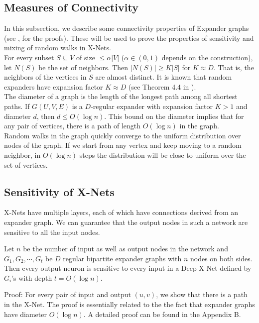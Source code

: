 \subsection{Measures of Connectivity}

\noindent In this subsection, we describe some connectivity properties of Expander graphs (see \cite{salil2012pseudo}, for the proofs). These will be used to prove the properties of sensitivity and mixing of random walks in X-Nets.\\

 For every subset $S \subseteq V$ of size $\leq \alpha |V|$ ($\alpha \in (0,1)$ depends on the construction), let $N(S)$ be the set of neighbors. Then $|N(S)| \geq K |S|$ for $K\approx D$. That is, the neighbors of the vertices in $S$ are almost distinct. It is known that random expanders have expansion factor $K \approx D$ (see Theorem 4.4 in \cite{salil2012pseudo}).\\

 The diameter of a graph is the length of the longest path among all shortest paths. If $G(U,V,E)$ is a $D$-regular expander with expansion factor $K > 1$ and diameter $d$, then  $d\leq O(\log n )$. This bound on the diameter implies that for any pair of vertices, there is a path of length $O(\log n)$ in the graph.\\

 Random walks in the graph quickly converge to the uniform distribution over nodes of the graph. If we start from any vertex and keep moving to a random neighbor, in $O(\log n)$ steps the distribution will be close to uniform over the set of vertices.

\subsection{Sensitivity of X-Nets}

\noindent X-Nets have multiple layers, each of which have connections derived from an expander graph. We can guarantee that the output nodes in such a network are sensitive to all the input nodes.\\

\begin{theorem}\label{thm:conn}
Let $n$ be the number of input as well as output nodes in the network and $G_1,G_2,\cdots, G_t$ be $D$ regular bipartite expander graphs with $n$ nodes on both sides. Then  
every output neuron is sensitive to every input in a Deep X-Net defined by $G_i$'s with depth $t = O( \log n)$.

Proof: For every pair of input and output $(u,v)$, we show that there is a path in the X-Net. The proof is essentially related to the the fact that expander graphs have diameter $O(\log n)$. A detailed proof can be found in the Appendix B.
\end{theorem}


